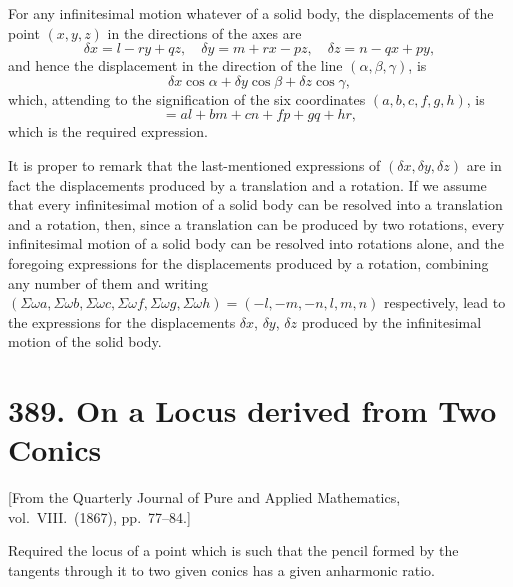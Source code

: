 \documentclass[12pt,a4paper]{article}
\theoremstyle{plain}
\theoremstyle{definition}
\theoremstyle{remark}
\begin{document}
\begin{enumerate}[label=\arabic*.]
For any infinitesimal motion whatever of a solid body, the displacements of the point $(x,y,z)$ in the directions of the axes are
\[\delta x = l - ry + qz, \quad \delta y = m + rx - pz, \quad \delta z = n - qx + py,\]
and hence the displacement in the direction of the line $(\alpha, \beta, \gamma)$, is
\[\delta x\cos\alpha + \delta y\cos\beta + \delta z\cos\gamma,\]
which, attending to the signification of the six coordinates $(a,b,c,f,g,h)$, is
\[= al + bm + cn + fp + gq + hr,\]
which is the required expression.

It is proper to remark that the last-mentioned expressions of $(\delta x, \delta y, \delta z)$ are in fact the displacements produced by a translation and a rotation. If we assume that every infinitesimal motion of a solid body can be resolved into a translation and a rotation, then, since a translation can be produced by two rotations, every infinitesimal motion of a solid body can be resolved into rotations alone, and the foregoing expressions for the displacements produced by a rotation, combining any number of them and writing $(\Sigma\omega a, \Sigma\omega b, \Sigma\omega c, \Sigma\omega f, \Sigma\omega g, \Sigma\omega h) = (-l, -m, -n, l, m, n)$ respectively, lead to the expressions for the displacements $\delta x$, $\delta y$, $\delta z$ produced by the infinitesimal motion of the solid body.
\end{enumerate}



\section*{389. On a Locus derived from Two Conics}

\begin{center}
\small [From the Quarterly Journal of Pure and Applied Mathematics, vol.~VIII.\ (1867), pp.~77--84.]
\end{center}

Required the locus of a point which is such that the pencil formed by the tangents through it to two given conics has a given anharmonic ratio.
\end{document}
